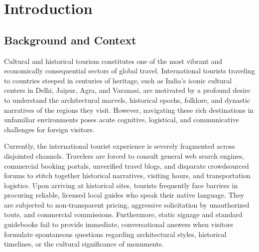 \documentclass[12pt,a4paper,twoside,openright]{report}
\begin{document}
\cleardoublepage

\chapter{Introduction}

\section{Background and Context}

Cultural and historical tourism constitutes one of the most vibrant and economically consequential sectors of global travel. International tourists traveling to countries steeped in centuries of heritage, such as India's iconic cultural centers in Delhi, Jaipur, Agra, and Varanasi, are motivated by a profound desire to understand the architectural marvels, historical epochs, folklore, and dynastic narratives of the regions they visit. However, navigating these rich destinations in unfamiliar environments poses acute cognitive, logistical, and communicative challenges for foreign visitors.

Currently, the international tourist experience is severely fragmented across disjointed channels. Travelers are forced to consult general web search engines, commercial booking portals, unverified travel blogs, and disparate crowdsourced forums to stitch together historical narratives, visiting hours, and transportation logistics. Upon arriving at historical sites, tourists frequently face barriers in procuring reliable, licensed local guides who speak their native language. They are subjected to non-transparent pricing, aggressive solicitation by unauthorized touts, and commercial commissions. Furthermore, static signage and standard guidebooks fail to provide immediate, conversational answers when visitors formulate spontaneous questions regarding architectural styles, historical timelines, or the cultural significance of monuments.
\end{document}
